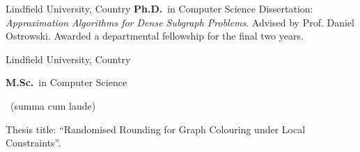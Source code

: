	{%
		Lindfield University, Country}
	{%
		\textbf{Ph.D.}~in Computer Science}
	{%
	Dissertation: \textit{Approximation Algorithms for Dense Subgraph Problems}. Advised by Prof. Daniel Ostrowski. Awarded a departmental fellowship for the final two years.}

		{%
			Lindfield University, Country}
		{%
			\textbf{M.Sc.}~in Computer Science\begin{footnotesize}
				~(summa cum laude)
			\end{footnotesize}}
		{%
		Thesis title: ``Randomised Rounding for Graph Colouring under Local Constraints''.}
